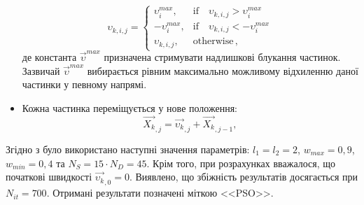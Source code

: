 \begin{itemize}[leftmargin=0cm,itemindent=1em]
 \begin{equation}
 \label{PSO_Vmax}
 \upsilon_{k,i,j}=\left\{
 \begin{array}{ll}
 \upsilon_{i}^{max},& \text{if} \quad \upsilon_{k,i,j}>\upsilon_{i}^{max}\\
 -\upsilon_{i}^{max},& \text{if} \quad \upsilon_{k,i,j}<-\upsilon_{i}^{max}\\
 \upsilon_{k,i,j},& \text{otherwise}\,,
 \end{array}
 \right.
 \end{equation}
де
константа $ \overrightarrow{\upsilon}^{max}$  призначена стримувати надлишкові блукання частинок.
Зазвичай \cite{PSO_Ye} $ \overrightarrow{\upsilon}^{max}$ вибирається рівним максимально можливому відхиленню даної частинки у певному напрямі.
 \item Кожна частинка переміщується у нове положення:
 \begin{equation}
 \label{eqPSO_Final}
 \overrightarrow{X_{k}}_{,j}=\overrightarrow{\upsilon_{k}}_{,j}+\overrightarrow{X_{k}}_{,j-1},
 \end{equation}
\end{itemize}
Згідно з \cite{PSO_Ye} було використано наступні значення параметрів:
$l_1=l_2=2$, $w_{max}=0,9$, $w_{min}=0,4$ та $N_S=15\cdot N_D=45$.
Крім того, при розрахунках вважалося, що початкові швидкості $\overrightarrow{\upsilon_{k}}_{,0}=0$.
Виявлено, що збіжність результатів досягається при $N_{it}=700$.
Отримані результати позначені міткою <<PSO>>.

